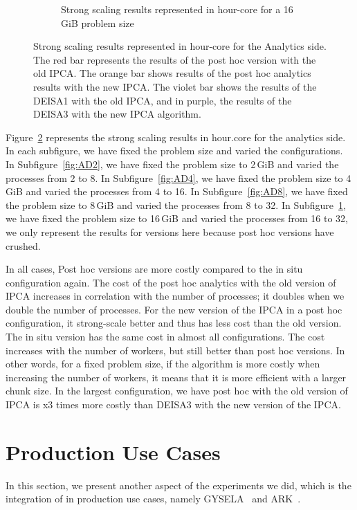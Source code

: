 \begin{figure}[hb]
\begin{subfigure}[b]{0.4\textwidth}
         \caption{Strong scaling results represented in hour-core for a 16\,GiB problem size}
         \label{fig:AD16}
     \end{subfigure}
        \caption{Strong scaling results represented in hour-core for the Analytics side. The red bar represents the results of the post hoc version with the old IPCA. The orange bar shows results of the post hoc analytics results with the new IPCA. The violet bar shows the results of the DEISA1 with the old IPCA, and in purple, the results of the DEISA3 with the new IPCA algorithm.}
        \label{fig:strongAnalytics}
\end{figure}


Figure~\ref{fig:strongAnalytics} represents the strong scaling results in  hour.core for the analytics side. In each subfigure, we have fixed the problem size and varied the configurations. 
In Subfigure~\ref{fig:AD2}, we have fixed the problem size to 2\,GiB and varied the processes from 2 to 8.
In Subfigure~\ref{fig:AD4}, we have fixed the problem size to 4\,GiB and varied the processes from 4 to 16.
In Subfigure~\ref{fig:AD8}, we have fixed the problem size to 8\,GiB and varied the processes from 8 to 32.
In Subfigure~\ref{fig:AD16}, we have fixed the problem size to 16\,GiB and varied the processes from 16 to 32, we only represent the results for \deisa versions here because post hoc versions have crushed.

In all cases, Post hoc versions are more costly compared to the in situ configuration again.
The cost of the post hoc analytics with the old version of IPCA increases in correlation with the number of processes; it doubles when we double the number of processes.
For the new version of the IPCA in a post hoc configuration, it strong-scale better and thus has less cost than the old version. 
The in situ version has the same cost in almost all configurations. The cost increases with the number of workers, but still better than post hoc versions. 
In other words, for a fixed problem size, if the algorithm is more costly when increasing the number of workers, it means that it is more efficient with a larger chunk size.   
In the largest configuration, we have post hoc with the old version of IPCA is x3 times more costly than DEISA3 with the new version of the IPCA. 

\section{Production Use Cases}
In this section, we present another aspect of the experiments we did, which is the integration of \deisa in production use cases, namely GYSELA~\cite{Grandgirard_CPC2016, latu:hal-01719208-gysela, latu:hal-01834323-gysela, bigot:hal-01050322-gysela} and ARK~\cite{Padioleau_2019}.

